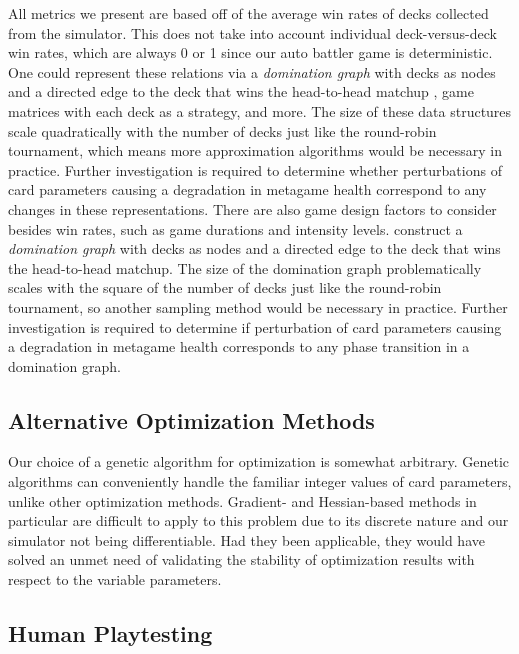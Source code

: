 \documentclass[letterpaper]{article} %
\begin{document}
All metrics we present are based off of the average win rates of decks collected from the simulator. 
This does not take into account individual deck-versus-deck win rates, which are always 0 or 1 since
our auto battler game is deterministic. One could represent these relations via a
\textit{domination graph} with decks
as nodes and a directed edge to the deck that wins the head-to-head matchup \cite{gkmmmf_eaai21},
game matrices with each deck as a strategy, and more.  The size of these data structures
scale quadratically with the number of decks just like the round-robin tournament, which means more approximation algorithms would be necessary in practice.
Further investigation is required to determine whether perturbations of card parameters causing a degradation
in metagame health correspond to any changes in these representations.  There are also game design factors to consider besides win rates, such as game durations and intensity levels.
construct a \textit{domination graph} with decks
as nodes and a directed edge to the deck that wins the head-to-head matchup. The size of the domination
graph problematically scales with the square of the number of decks just like the round-robin tournament,
so another sampling method would be necessary in practice. Further investigation is required to determine if perturbation of card parameters causing a degradation
in metagame health corresponds to any phase transition in a domination graph.
\fi



\subsection{Alternative Optimization Methods}

Our choice of a genetic algorithm for optimization is somewhat arbitrary. Genetic algorithms can conveniently 
handle the familiar integer values of card parameters, unlike other optimization methods. Gradient- and Hessian-based
methods in particular are difficult to apply to this problem due to its discrete nature and our simulator not being
differentiable. Had they been applicable, they would have solved an unmet need of %
validating the stability of optimization
results with respect to the variable parameters.

\subsection{Human Playtesting}
\end{document}

